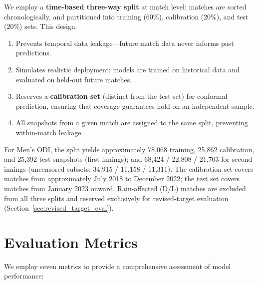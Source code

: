\documentclass[12pt,a4paper,oneside]{report}
\begin{document}
We employ a \textbf{time-based three-way split} at match level: matches are sorted chronologically, and partitioned into training (60\%), calibration (20\%), and test (20\%) sets.  This design:

\begin{enumerate}[nosep]
    \item Prevents temporal data leakage---future match data never informs past predictions.
    \item Simulates realistic deployment: models are trained on historical data and evaluated on held-out future matches.
    \item Reserves a \textbf{calibration set} (distinct from the test set) for conformal prediction, ensuring that coverage guarantees hold on an independent sample.
    \item All snapshots from a given match are assigned to the same split, preventing within-match leakage.
\end{enumerate}

For Men's ODI, the split yields approximately 78,068 training, 25,862 calibration, and 25,392 test snapshots (first innings); and 68,424 / 22,808 / 21,703 for second innings (uncensored subsets: 34,915 / 11,158 / 11,311).  The calibration set covers matches from approximately July 2018 to December 2022; the test set covers matches from January 2023 onward.  Rain-affected (D/L) matches are excluded from all three splits and reserved exclusively for revised-target evaluation (Section~\ref{sec:revised_target_eval}).

\section{Evaluation Metrics}

We employ seven metrics to provide a comprehensive assessment of model performance:
\end{document}
